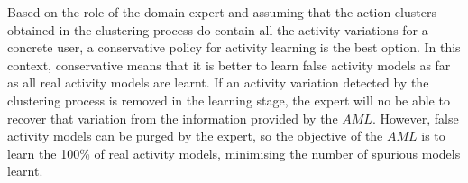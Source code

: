 Based on the role of the domain expert and assuming that the action clusters obtained in the clustering process do contain all the activity variations for a concrete user, a conservative policy for activity learning is the best option. In this context, conservative means that it is better to learn false activity models as far as all real activity models are learnt. If an activity variation detected by the clustering process is removed in the learning stage, the expert will no be able to recover that variation from the information provided by the $AML$. However, false activity models can be purged by the expert, so the objective of the $AML$ is to learn the 100\% of real activity models, minimising the number of spurious models learnt. 


